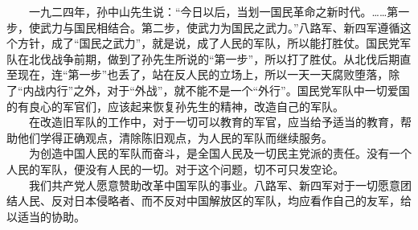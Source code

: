 \documentclass[cn,11pt,chinese]{elegantbook}
\begin{document}
　　一九二四年，孙中山先生说：“今日以后，当划一国民革命之新时代。……第一步，使武力与国民相结合。第二步，使武力为国民之武力。”八路军、新四军遵循这个方针，成了“国民之武力”，就是说，成了人民的军队，所以能打胜仗。国民党军队在北伐战争前期，做到了孙先生所说的“第一步”，所以打了胜仗。从北伐后期直至现在，连“第一步”也丢了，站在反人民的立场上，所以一天一天腐败堕落，除了“内战内行”之外，对于“外战”，就不能不是一个“外行”。国民党军队中一切爱国的有良心的军官们，应该起来恢复孙先生的精神，改造自己的军队。\\
　　在改造旧军队的工作中，对于一切可以教育的军官，应当给予适当的教育，帮助他们学得正确观点，清除陈旧观点，为人民的军队而继续服务。\\
　　为创造中国人民的军队而奋斗，是全国人民及一切民主党派的责任。没有一个人民的军队，便没有人民的一切。对于这个问题，切不可只发空论。\\
　　我们共产党人愿意赞助改革中国军队的事业。八路军、新四军对于一切愿意团结人民、反对日本侵略者、而不反对中国解放区的军队，均应看作自己的友军，给以适当的协助。\\
\end{document}
